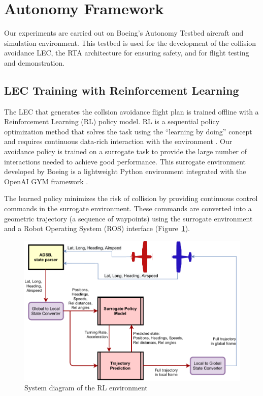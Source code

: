\section{Autonomy Framework}

Our experiments are carried out on Boeing's Autonomy Testbed aircraft and simulation environment.  This testbed is used for the development of the collision avoidance LEC, the RTA architecture for ensuring safety, and for flight testing and demonstration.  



\subsection{LEC Training with Reinforcement Learning}

The LEC that generates the collsion avoidance flight plan is trained offline with a 
Reinforcement Learning (RL) policy model. 
RL is a sequential policy optimization method that solves the task using the ``learning by doing'' concept and requires continuous data-rich interaction with the environment \cite{sutton2018reinforcement}. 
Our avoidance policy is trained on a surrogate task to provide the large number of interactions needed to achieve good performance. 
This surrogate environment developed by Boeing is a lightweight Python environment integrated with the OpenAI GYM framework \cite{brockman2016openai}.

The learned policy minimizes the risk of collision by providing continuous control commands in the surrogate environment. These commands are converted into a geometric trajectory (a sequence of waypoints) using the surrogate environment and a Robot Operating System (ROS) interface (Figure~\ref{fig:diagram}).

\begin{figure}[h]
	\centering
	\includegraphics[width=\linewidth]{figures/system_overview.pdf}
	\caption{System diagram of the RL environment}
	\label{fig:diagram}
\end{figure}


